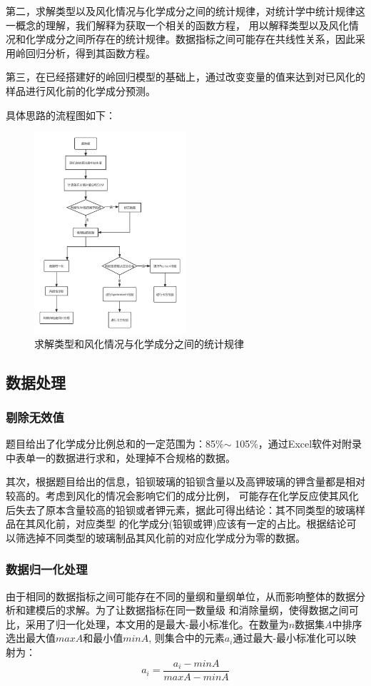 \documentclass[UTF8]{ctexart}
\begin{document}
第二，求解类型以及风化情况与化学成分之间的统计规律，对统计学中统计规律这一概念的理解，我们解释为获取一个相关的函数方程，
用以解释类型以及风化情况和化学成分之间所存在的统计规律。数据指标之间可能存在共线性关系，因此采用岭回归分析，得到其函数方程。

第三，在已经搭建好的岭回归模型的基础上，通过改变变量的值来达到对已风化的样品进行风化前的化学成分预测。

具体思路的流程图如下：
\begin{figure}[H]\centering
	\includegraphics[width=0.5\textwidth,height=0.55\textwidth]{img/第一问流程图.png} %
	\caption{求解类型和风化情况与化学成分之间的统计规律} %
	\label{fig:figure 1} %
\end{figure}


\subsection{数据处理}
\subsubsection{剔除无效值}
题目给出了化学成分比例总和的一定范围为：85$\%$$ \sim $ 105$\%$，通过Excel软件对附录中表单一的数据进行求和，处理掉不合规格的数据。

其次，根据题目给出的信息，铅钡玻璃的铅钡含量以及高钾玻璃的钾含量都是相对较高的。考虑到风化的情况会影响它们的成分比例，
可能存在化学反应使其风化后失去了原本含量较高的铅钡或者钾元素，据此可得出结论：其不同类型的玻璃样品在其风化前，对应类型
的化学成分(铅钡或钾)应该有一定的占比。根据结论可以筛选掉不同类型的玻璃制品其风化前的对应化学成分为零的数据。



\subsubsection{数据归一化处理}
由于相同的数据指标之间可能存在不同的量纲和量纲单位，从而影响整体的数据分析和建模后的求解。为了让数据指标在同一数量级
和消除量纲，使得数据之间可比，采用了归一化处理，本文用的是最大-最小标准化。在数量为$n$数据集$A$中排序选出最大值$maxA$和最小值$minA$,
则集合中的元素$a_i$通过最大-最小标准化可以映射为：
\begin{equation}
	a_i = \frac{a_i-minA}{maxA-minA}
\end{equation}
\end{document}

